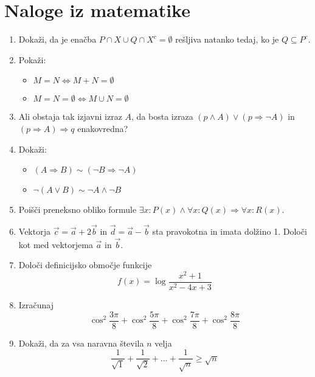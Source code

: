 \documentclass[a4paper,12pt]{article}
\begin{document}
\section*{Naloge iz matematike}

\begin{enumerate}


\item Dokaži, da je enačba $P \cap X \cup Q \cap X^c= \emptyset $
rešljiva natanko tedaj, ko je $Q \subseteq P^c$.

\item Pokaži:
\begin{itemize}

    \item $M=N \iff M+N=\emptyset$
    \item $M=N=\emptyset \iff M \cup N=\emptyset$

\end{itemize}


\item Ali obstaja tak izjavni izraz $A$, da bosta izraza
$(p\wedge A) \vee (p \Rightarrow \neg A)$ in $(p\Rightarrow A) \Rightarrow q$
enakovredna?

\item Dokaži:
\begin{itemize}
    \item $(A \Rightarrow B) \sim (\neg B \Rightarrow \neg A)$
    \item $\neg (A\vee B)\sim \neg A \wedge \neg B$
\end{itemize}


\item Poišči preneksno obliko formule $\exists x: P(x) \wedge \forall x: Q(x)\Rightarrow \forall x: R(x)$.

\item Vektorja $\vec{c}=\vec{a}+2\vec{b}$ in $\vec{d}=\vec{a}-\vec{b}$
sta pravokotna in imata dolžino 1. Določi kot med vektorjema $\vec{a}$ in $\vec{b}$.

\item Določi definicijsko območje funkcije
\[
f(x)=\log \frac{x^2 +1}{x^2 -4x+3}
\]

\item Izračunaj
\[
    \cos^2{\frac{3\pi}{8}}+\cos^2{\frac{5\pi}{8}}+\cos^2{\frac{7\pi}{8}}+\cos^2{\frac{8\pi}{8}}
\]

\item Dokaži, da za vsa naravna števila $n$ velja
\[
    \frac{1}{\sqrt{1}}+\frac{1}{\sqrt{2}}+\dots+\frac{1}{\sqrt{n}}\geq \sqrt{n}
\]


\end{enumerate}
\end{document}
